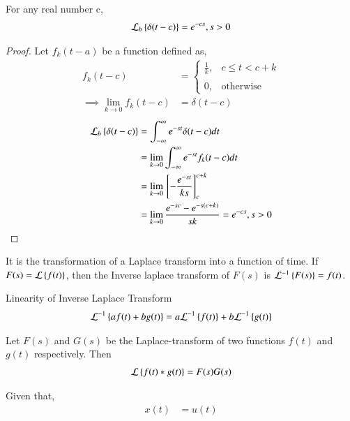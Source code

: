 \documentclass[journal,12pt,twocolumn]{IEEEtran}
\begin{document}
\begin{lemma}
For any real number c,
\begin{align}
     \mathcal{L}_b\left\{\delta(t-c)\right\}=e^{-cs}, s>0\label{eq:d}
\end{align}     
\end{lemma}
\begin{proof}
 Let $f_k(t-a)$ be a function defined as,
 \begin{align}
     f_k(t-c)&= \begin{cases}
    \frac{1}{k}, & c \leq t < c+k \\~\\[-1em]
	0, & \text{otherwise}
	\end{cases}\\
	\implies\lim_{k \to 0} f_k(t-c) &= \delta(t-c)
 \end{align}
\begin{align}
     \mathcal{L}_b\left\{\delta(t-c)\right\}&=\int_{-\infty}^{\infty}e^{-st}\delta(t-c)dt\\&=\lim_{k \to 0}\int_{-\infty}^{\infty}e^{-st}f_k(t-c)dt\\
     &=\lim_{k \to 0}{}\left[-\dfrac{e^{-st}}{ks}\right]_{c}^{c+k}\\&= \lim_{k \to 0}\dfrac{e^{-sc}-e^{-s(c+k)}}{sk} =e^{-cs}, s>0
\end{align}     
\end{proof}
\begin{definition}
It is the transformation of a Laplace transform into a function of time. If $F(s)=\mathcal{L}\left\{f(t)\right\}$, then the Inverse laplace transform of $F(s)$ is $\mathcal{L}^{-1}\left\{F(s)\right\}=f(t)$.
\end{definition}
\begin{lemma}
Linearity of Inverse Laplace Transform
\begin{align}
    \mathcal{L}^{-1}\left\{af(t)+bg(t)\right\} = a\mathcal{L}^{-1}\left\{f(t)\right\}+b\mathcal{L}^{-1}\left\{g(t)\right\}\label{eq:linearity-1}
\end{align}
\end{lemma}
\begin{theorem} \label{ct}
Let $F(s)$ and $G(s)$ be the Laplace-transform of two functions $f(t)$ and $g(t)$ respectively. Then
\begin{align}
\mathcal{L}\left\{f(t) * g(t)\right\}=F(s)G(s)
\end{align}
\end{theorem}
Given that,
\begin{align}
    x(t) &= u(t)\label{eq:x}
\end{align}
\end{document}
